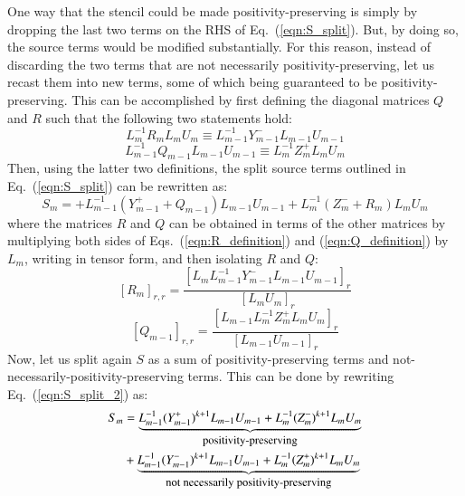 \documentclass{warpdoc}
\newcommand{\alb}{\vspace{0.2cm}\\} %
\begin{document}
One way that the stencil could be made positivity-preserving is simply by dropping the last two terms on the RHS of Eq.\ (\ref{eqn:S_split}). But, by doing so, the source terms would be modified substantially. For this reason, instead of discarding the two terms that are not necessarily positivity-preserving, let us recast them into new terms, some of which being guaranteed to be positivity-preserving. This can be accomplished by first defining the diagonal matrices $Q$ and $R$ such that the following two statements hold:
%
\begin{equation}
L^{-1}_{m} R_{m} L_{m} U_{m} \equiv L^{-1}_{m-1} Y^-_{m-1} L_{m-1} U_{m-1}
\label{eqn:R_definition}
\end{equation}
%
%
\begin{equation}
L^{-1}_{m-1} Q_{m-1} L_{m-1} U_{m-1} \equiv L^{-1}_{m} Z^+_{m} L_{m} U_{m}
\label{eqn:Q_definition}
\end{equation}
%
Then, using the latter two definitions, the split source terms outlined in Eq.\ (\ref{eqn:S_split}) can be rewritten as:
%
\begin{equation}
S_{m}=
+ L^{-1}_{m-1} (Y^+_{m-1}+Q_{m-1}) L_{m-1} U_{m-1} 
+ L^{-1}_{m} (Z^-_{m}+R_{m}) L_{m} U_{m}
\label{eqn:S_split_2}
\end{equation}
%
where the matrices $R$ and $Q$ can  be obtained in terms of the other matrices by multiplying both sides of Eqs.\ (\ref{eqn:R_definition}) and (\ref{eqn:Q_definition}) by $L_{m}$, writing in tensor form, and then isolating $R$ and $Q$:
%
\begin{equation}
\left[R_{m}\right]_{r,r}  = \frac{\left[L_{m} L^{-1}_{m-1} Y^-_{m-1} L_{m-1} U_{m-1}\right]_r}{\left[L_{m} U_{m}\right]_r}
\label{eqn:R_2}
\end{equation}
%
%
\begin{equation}
\left[Q_{m-1}\right]_{r,r} = \frac{\left[L_{m-1} L^{-1}_{m} Z^+_{m} L_{m} U_{m}\right]_r}{\left[L_{m-1} U_{m-1}\right]_r}
\label{eqn:Q_2}
\end{equation}
%
Now, let us split again $S$ as a sum of positivity-preserving terms and not-necessarily-positivity-preserving terms. This can be done by rewriting Eq.\ (\ref{eqn:S_split_2}) as:
%
\begin{align}
S_{m}&=
\underbrace{ 
 L^{-1}_{m-1} (Y^+_{m-1})^{k+1} L_{m-1} U_{m-1}+L^{-1}_{m} (Z^-_{m})^{k+1} L_{m} U_{m}}_\textrm{\small positivity-preserving}\nonumber\alb
&+\underbrace{  L^{-1}_{m-1} (Y^-_{m-1})^{k+1} L_{m-1} U_{m-1} 
+ L^{-1}_{m} (Z^+_{m})^{k+1} L_{m} U_{m}}_\textrm{\small not~necessarily~positivity-preserving} 
\label{eqn:S_split_3}
\end{align}
\end{document}
